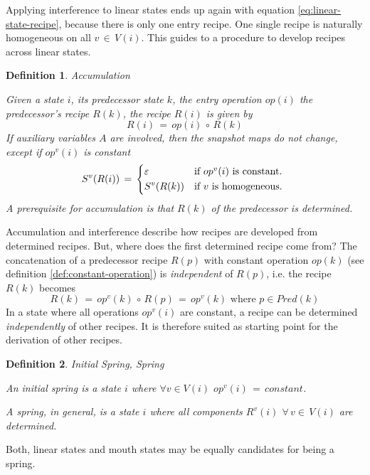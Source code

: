 \documentclass[12pt,a4paper]{scrartcl}
\newtheorem{definition}{Definition}
\begin{document}
Applying interference to linear states ends up again with equation
\eqref{eq:linear-state-recipe}, because there is only one entry recipe.  One
single recipe is naturally homogeneous on all $v\,\in\,V(i)$. This guides to a
procedure to develop recipes across linear states.

\begin{definition} Accumulation

Given a state $i$, its predecessor state $k$, the entry operation $op(i)$
the predecessor's recipe $R(k)$, the recipe $R(i)$ is given by
\begin{equation}
       R(i)\,=\,op(i)\,\circ\,R(k)
\end{equation}
If auxiliary variables $A$ are involved, then the snapshot maps do not change,
except if $op^v(i)$ is constant
\begin{equation} \label{eq:accumulation-aux}
    S^v(R(i))\,=\,\begin{dcases*}
                  \varepsilon & if $op^v(i)$ is constant. \\
                  S^v(R(k))   & if $v$ is homogeneous.\\
                \end{dcases*}
\end{equation}
A prerequisite for accumulation is that $R(k)$ of the predecessor is 
determined.
\end{definition}
Accumulation and interference describe how recipes are developed from
determined recipes.  But, where does the first determined recipe come from?
The concatenation of a predecessor recipe $R(p)$ with constant operation
$op(k)$ (see definition \ref{def:constant-operation}) is \textit{independent}
of $R(p)$, i.e. the recipe $R(k)$ becomes
\begin{equation}
    R(k)\,=\,op^v(k)\,\circ\,R(p)\,=\,op^v(k)\,\,\mbox{where $p\in Pred(k)$}
\end{equation}
In a state where all operations $op^v(i)$ are constant, a recipe can be determined
\textit{independently} of other recipes. It is therefore suited as starting
point for the derivation of other recipes.
\begin{definition} Initial Spring, Spring \label{def:springs}

    An initial spring is a state $i$ where $\forall v \in V(i)$ $op^v(i)\,=\,constant$.

    A spring, in general, is a state $i$ where all components $R^v(i)$
    $\forall\,v\in\,V(i)$ are determined.
    
\end{definition}
Both, linear states and mouth states may be equally candidates for being a 
spring.
\end{document}
